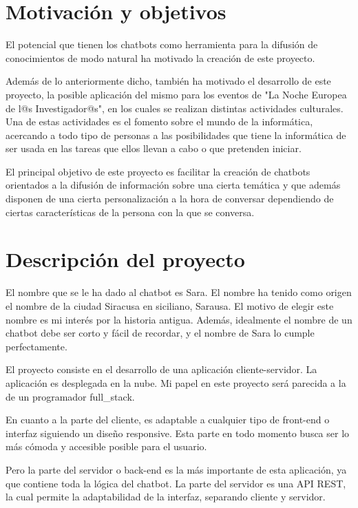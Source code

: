 \section{Motivación y objetivos}

El potencial que tienen los \glspl{chatbot} como herramienta para la difusión de conocimientos de modo natural ha motivado la creación de este proyecto.

Además de lo anteriormente dicho, también ha motivado el desarrollo de este proyecto, la posible aplicación del mismo para los eventos de "La Noche Europea de l@s Investigador@s", en los cuales se realizan distintas actividades culturales. Una de estas actividades es el fomento sobre el mundo de la informática, acercando a todo tipo de personas a las posibilidades que tiene la informática de ser usada en las tareas que ellos llevan a cabo o que pretenden iniciar.

El principal objetivo de este proyecto es facilitar la creación de \glspl{chatbot} orientados a la difusión de información sobre una cierta temática y que además disponen de una cierta personalización a la hora de conversar dependiendo de ciertas características de la persona con la que se conversa.

\section{Descripción del proyecto}

El nombre que se le ha dado al \gls{chatbot} es Sara. El nombre ha tenido como origen el nombre de la ciudad \gls{Siracusa} en siciliano, Sarausa. El motivo de elegir este nombre es mi interés por la historia antigua. Además, idealmente el nombre de un \gls{chatbot} debe ser corto y fácil de recordar, y el nombre de Sara lo cumple perfectamente.

El proyecto consiste en el desarrollo de una aplicación cliente-servidor. La aplicación es desplegada en la nube. Mi papel en este proyecto será parecida a la de un programador \gls{full_stack}.

En cuanto a la parte del cliente, es adaptable a cualquier tipo de \gls{front-end} o interfaz siguiendo un diseño \gls{responsive}. Esta parte en todo momento busca ser lo más cómoda y accesible posible para el usuario.

Pero la parte del servidor o \gls{back-end} es la más importante de esta aplicación, ya que contiene toda la lógica del \gls{chatbot}. La parte del servidor es una \gls{API REST}, la cual permite la adaptabilidad de la interfaz, separando cliente y servidor.

